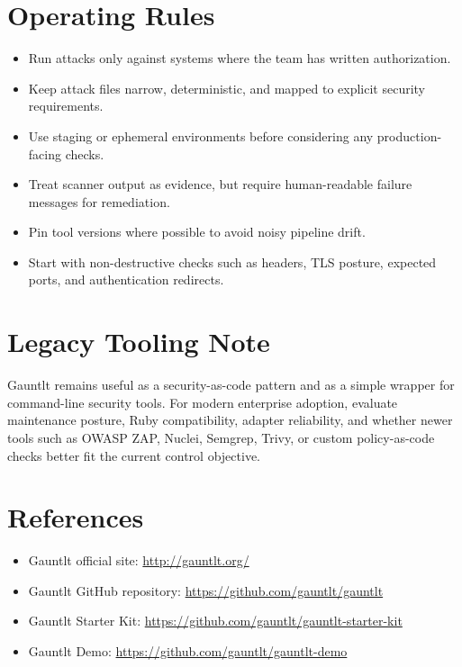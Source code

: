 \documentclass[11pt]{article}
\begin{document}
\section{Operating Rules}
\begin{itemize}
  \item Run attacks only against systems where the team has written authorization.
  \item Keep attack files narrow, deterministic, and mapped to explicit security requirements.
  \item Use staging or ephemeral environments before considering any production-facing checks.
  \item Treat scanner output as evidence, but require human-readable failure messages for remediation.
  \item Pin tool versions where possible to avoid noisy pipeline drift.
  \item Start with non-destructive checks such as headers, TLS posture, expected ports, and authentication redirects.
\end{itemize}

\section{Legacy Tooling Note}
Gauntlt remains useful as a security-as-code pattern and as a simple wrapper for command-line security tools. For modern enterprise adoption, evaluate maintenance posture, Ruby compatibility, adapter reliability, and whether newer tools such as OWASP ZAP, Nuclei, Semgrep, Trivy, or custom policy-as-code checks better fit the current control objective.


\section*{References}
\begin{itemize}
  \item Gauntlt official site: \url{http://gauntlt.org/}
  \item Gauntlt GitHub repository: \url{https://github.com/gauntlt/gauntlt}
  \item Gauntlt Starter Kit: \url{https://github.com/gauntlt/gauntlt-starter-kit}
  \item Gauntlt Demo: \url{https://github.com/gauntlt/gauntlt-demo}
\end{itemize}
\end{document}
